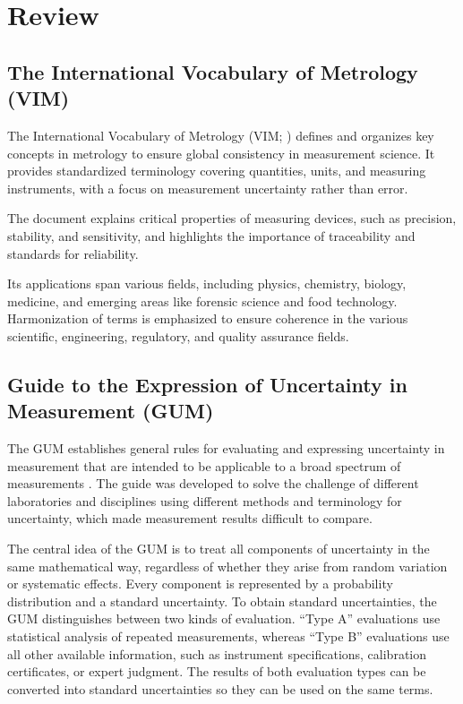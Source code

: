 \section{Review} \label{sec:review}

\subsection{The International Vocabulary of Metrology (VIM)}

The International Vocabulary of Metrology (\acs{VIM}; \cite{JCGMVIM}) defines
and organizes key concepts in metrology to ensure global consistency in
measurement science. It provides standardized terminology covering quantities,
units, and measuring instruments, with a focus on measurement uncertainty rather
than error.

The document explains critical properties of measuring devices, such as
precision, stability, and sensitivity, and highlights the importance of
traceability and standards for reliability. 

Its applications span various fields, including physics, chemistry, biology,
medicine, and emerging areas like forensic science and food technology.
Harmonization of terms is emphasized to ensure coherence in the various
scientific, engineering, regulatory, and quality assurance fields.

\subsection{Guide to the Expression of Uncertainty in Measurement (GUM)}

The \acf{GUM} establishes general rules for evaluating and expressing
uncertainty in measurement that are intended to be applicable to a broad
spectrum of measurements \cite{JCGMGUM}.  The guide was developed to solve the
challenge of different laboratories and disciplines using different methods and
terminology for uncertainty, which made measurement results difficult to
compare.

The central idea of the \ac{GUM} is to treat all components of uncertainty in
the same mathematical way, regardless of whether they arise from random
variation or systematic effects. Every component is represented by a
probability distribution and a standard uncertainty.  To obtain standard
uncertainties, the \ac{GUM} distinguishes between two kinds of evaluation.
``Type A'' evaluations use statistical analysis of repeated measurements,
whereas ``Type B'' evaluations use all other available information, such as
instrument specifications, calibration certificates, or expert judgment.  The
results of both evaluation types can be converted into standard uncertainties
so they can be used on the same terms.


